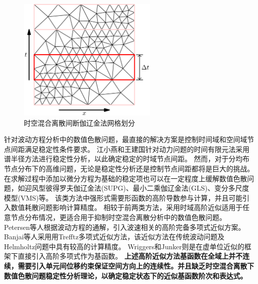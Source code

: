 \begin{figure}[!h]
    \centering 
    \includegraphics[width=0.6\textwidth]{figures/wave_2D.png}
    \caption{时空混合离散间断伽辽金法网格划分}
    \label{fg:slab}
\end{figure}

针对波动方程分析中的数值色散问题，最直接的解决方案是控制时间域和空间域节点间距满足稳定性条件要求\cite{bajer1986}。
江小燕和王建国\cite{JiangXiaoYan2014}针对动力问题的时间有限元法采用谱半径方法进行稳定性分析，以此确定稳定的时域节点间距。
然而，对于分均布节点分布下的高维问题，无论是稳定性分析还是控制节点间距都将是巨大的挑战。
在求解过程中添加以微分方程为基础的稳定项也可以在一定程度上缓解数值色散问题，如迎风型彼得罗夫伽辽金法(SUPG)\cite{hughes1988}、最小二乘伽辽金法(GLS)\cite{hughes2000}、变分多尺度模型(VMS)\cite{hughes1996}等。
该类方法中强形式需要形函数的高阶导数参与计算，并且可能引入数值耗散问题影响计算精度。
相较于前两类方法，采用时域高阶近似适用于任意节点分布情况，更适合用于抑制时空混合离散分析中的数值色散问题。
Petersen等人\cite{petersen2000}根据波动方程的通解，引入波速相关的高阶完备多项式近似方案。
Banjai等人\cite{banjai2017}采用用Trefftz多项式近似方法，该近似方法在传统波动问题及Helmholtz问题中具有较高的计算精度。
Wriggers和Junker\cite{wriggers2024}则是在虚单位近似的框架下直接引入高阶多项式作为基函数。
\textbf{上述高阶近似方法基函数在全域上并不连续，需要引入单元间位移约束保证空间方向上的连续性。并且缺乏时空混合离散下数值色散问题稳定性分析理论，以确定稳定状态下的近似基函数阶次和表达式。}

